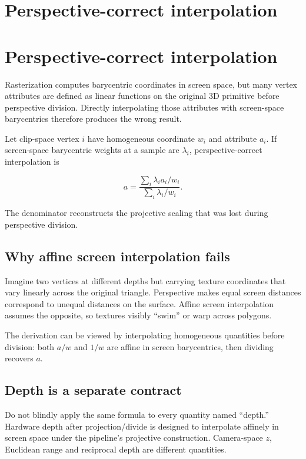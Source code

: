 \hypertarget{appendix-1ed5f96c73ea}{}
\section*{Perspective-correct interpolation}
\section{Perspective-correct interpolation}\label{perspective-correct-interpolation}

Rasterization computes barycentric coordinates in screen space, but many vertex attributes are defined as linear functions on the original 3D primitive before perspective division. Directly interpolating those attributes with screen-space barycentrics therefore produces the wrong result.

Let clip-space vertex \(i\) have homogeneous coordinate \(w_i\) and attribute \(a_i\). If screen-space barycentric weights at a sample are \(\lambda_i\), perspective-correct interpolation is

\[
a=
\frac{
\sum_i \lambda_i a_i/w_i
}{
\sum_i \lambda_i /w_i
}.
\]

The denominator reconstructs the projective scaling that was lost during perspective division.

\subsection{Why affine screen interpolation fails}\label{why-affine-screen-interpolation-fails}

Imagine two vertices at different depths but carrying texture coordinates that vary linearly across the original triangle. Perspective makes equal screen distances correspond to unequal distances on the surface. Affine screen interpolation assumes the opposite, so textures visibly ``swim'' or warp across polygons.

The derivation can be viewed by interpolating homogeneous quantities before division: both \(a/w\) and \(1/w\) are affine in screen barycentrics, then dividing recovers \(a\).

\subsection{Depth is a separate contract}\label{depth-is-a-separate-contract}

Do not blindly apply the same formula to every quantity named ``depth.'' Hardware depth after projection/divide is designed to interpolate affinely in screen space under the pipeline's projective construction. Camera-space \(z\), Euclidean range and reciprocal depth are different quantities.

